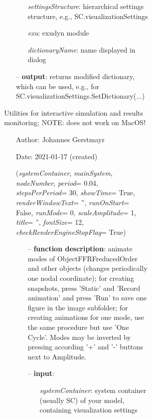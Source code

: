 \begin{itemize}[leftmargin=1.4cm]
\begin{itemize}[leftmargin=1.4cm]
\begin{itemize}[leftmargin=0.5cm]
\begin{itemize}[leftmargin=1.4cm]
\begin{itemize}[leftmargin=1.4cm]
\begin{itemize}[leftmargin=0.5cm]
\begin{itemize}[leftmargin=1.4cm]
\begin{itemize}[leftmargin=0.5cm]
\begin{itemize}[leftmargin=1.4cm]
\begin{itemize}[leftmargin=0.7cm]
\begin{itemize}[leftmargin=1.2cm]
\setlength{\itemindent}{-0.7cm}
\item[]{\it settingsStructure}: hierarchical settings structure, e.g., SC.visualizationSettings
\item[]{\it exu}: exudyn module
\item[]{\it dictionaryName}: name displayed in dialog
\end{itemize}
\item[--]{\bf output}: returns modified dictionary, which can be used, e.g., for SC.visualizationSettings.SetDictionary(...)
\vspace{12pt}\end{itemize}
%
\label{sec:module:interactive}
  Utilities for interactive simulation and results monitoring; NOTE: does not work on MacOS!
\begin{itemize}[leftmargin=1.4cm]
\setlength{\itemindent}{-1.4cm}
\item[]Author:    Johannes Gerstmayr
\item[]Date:      2021-01-17 (created)
\ei
\begin{flushleft}
\label{sec:interactive:AnimateModes}
({\it systemContainer}, {\it mainSystem}, {\it nodeNumber}, {\it period}= 0.04, {\it stepsPerPeriod}= 30, {\it showTime}= True, {\it renderWindowText}= '', {\it runOnStart}= False, {\it runMode}= 0, {\it scaleAmplitude}= 1, {\it title}= '', {\it fontSize}= 12, {\it checkRenderEngineStopFlag}= True)
\end{flushleft}
\setlength{\itemindent}{0.7cm}
\begin{itemize}[leftmargin=0.7cm]
\item[--]{\bf function description}: animate modes of ObjectFFRFreducedOrder and other objects (changes periodically one nodal coordinate); for creating snapshots, press 'Static' and 'Record animation' and press 'Run' to save one figure in the image subfolder; for creating animations for one mode, use the same procedure but use 'One Cycle'. Modes may be inverted by pressing according '+' and '-' buttons next to Amplitude.
\item[--]{\bf input}: \vspace{-6pt}
\begin{itemize}[leftmargin=1.2cm]
\setlength{\itemindent}{-0.7cm}
\item[]{\it systemContainer}: system container (usually SC) of your model, containing visualization settings

\end{itemize}
\end{itemize}
\end{itemize}
\end{itemize}
\end{itemize}
\end{itemize}
\end{itemize}
\end{itemize}
\end{itemize}
\end{itemize}
\end{itemize}
\end{itemize}
